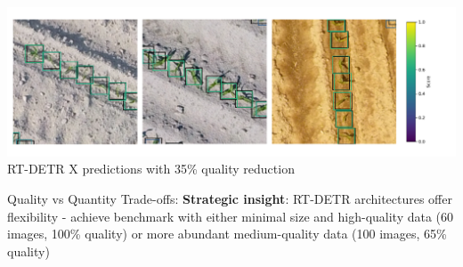 \documentclass[aspectratio=43]{beamer}
\begin{document}
\begin{frame}
    \begin{center}
        \includegraphics[width=1\textwidth]{Imgs/many_shot_quality_annotations.pdf}
        \tiny RT-DETR X predictions with 35\% quality reduction
    \end{center}
    
    \begin{block}{Quality vs Quantity Trade-offs:}
        \scriptsize
        \textbf{Strategic insight}: RT-DETR architectures offer flexibility - achieve benchmark with either minimal size and high-quality data (60 images, 100\% quality) or more abundant medium-quality data (100 images, 65\% quality)
    \end{block}
\end{frame}

\end{document}
